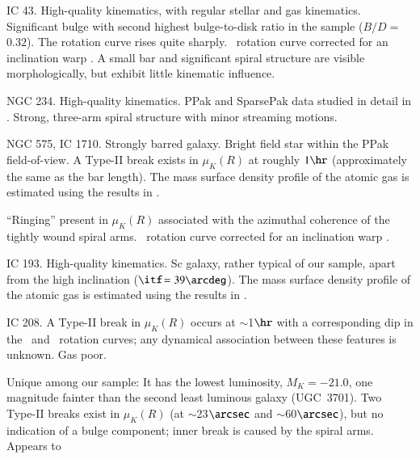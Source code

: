 \documentclass[traditabstract]{aa} %
\begin{document}
{\begin{list}{}
%
  {
%
  \settowidth{\labelwidth}{\bf UGC 00000:}
%
  \setlength{\labelsep}{1em}
%
  \setlength{\itemsep}{0.2em}
%
  \setlength{\parskip}{0.2em}
%
  \setlength{\leftmargin}{\labelwidth}
%
  \setlength{\rightmargin}{0pt}
%
  }
%
  \item[{\bf UGC   448:}] IC 43.  High-quality kinematics, with regular stellar and gas
  kinematics. Significant bulge with second highest bulge-to-disk ratio in the sample
  ($B/D$$=$$0.32$). The rotation curve rises quite sharply. \hone\ rotation curve
  corrected for an inclination warp \citep{martinsson2011}. A small bar and significant 
  spiral structure are visible morphologically, but exhibit little kinematic influence.
%
  \item[{\bf UGC   463:}] NGC 234.  High-quality kinematics. PPak and SparsePak
  data studied in detail in . Strong, three-arm
  spiral structure with minor streaming motions.
%
  \item[{\bf UGC  1081:}] NGC 575, IC 1710. Strongly barred galaxy. Bright
  field star within the PPak field-of-view. A Type-II break exists in $\mu_K(R)$
  at roughly $1\hr$ (approximately the same as the bar length).
  The mass surface density profile of the atomic gas is estimated using the results 
  in \cite{martinsson2011}.
%
  \item[{\bf UGC  1087:}] ``Ringing'' present in $\mu_K(R)$ associated with the
  azimuthal coherence of the tightly wound spiral arms.
  \hone\ rotation curve corrected for an inclination warp \citep{martinsson2011}.
%
  \item[{\bf UGC  1529:}] IC 193.  High-quality kinematics. Sc galaxy, rather
  typical of our sample, apart from the high inclination ($\itf$$=39\arcdeg$).
  The mass surface density profile of the atomic gas is estimated using the
  results in \cite{martinsson2011}.
%
  \item[{\bf UGC  1635:}] IC 208. A Type-II break in $\mu_K(R)$ occurs at $\sim$1$\hr$
  with a corresponding dip in the \oiii\ and \halp\ rotation curves; any dynamical
  association between these features is unknown. Gas poor.
%
  \item[{\bf UGC  1862:}] Unique among our sample: It has the lowest luminosity,
  $M_K$$=$$-21.0$, one magnitude fainter than the second least luminous galaxy (UGC~3701).
  Two Type-II breaks exist in $\mu_K(R)$ (at $\sim$23$\arcsec$ and $\sim$60$\arcsec$), but
  no indication of a bulge component; inner break is caused by the spiral arms. Appears to
$$
\end{list}}
\end{document}
